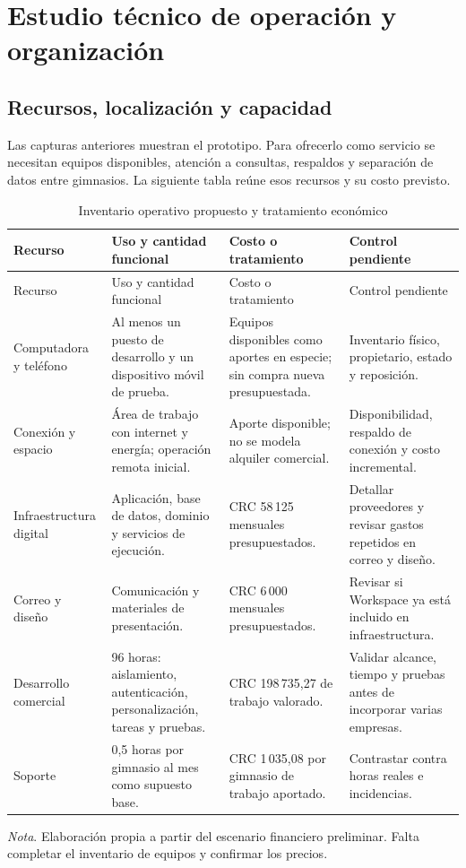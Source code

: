 \section{Estudio técnico de operación y organización}
\label{sec:organizacion}

\subsection{Recursos, localización y capacidad}

Las capturas anteriores muestran el prototipo. Para ofrecerlo como servicio se
necesitan equipos disponibles, atención a consultas, respaldos y separación de
datos entre gimnasios. La siguiente tabla reúne esos recursos y su costo
previsto.

\begin{longtable}{p{3cm}p{3.2cm}p{4cm}p{3.7cm}}
\caption{Inventario operativo propuesto y tratamiento económico}\\
\toprule Recurso & Uso y cantidad funcional & Costo o tratamiento & Control pendiente \\
\midrule\endfirsthead
\toprule Recurso & Uso y cantidad funcional & Costo o tratamiento & Control pendiente \\
\midrule\endhead
Computadora y teléfono & Al menos un puesto de desarrollo y un dispositivo móvil de prueba. & Equipos disponibles como aportes en especie; sin compra nueva presupuestada. & Inventario físico, propietario, estado y reposición. \\
Conexión y espacio & Área de trabajo con internet y energía; operación remota inicial. & Aporte disponible; no se modela alquiler comercial. & Disponibilidad, respaldo de conexión y costo incremental. \\
Infraestructura digital & Aplicación, base de datos, dominio y servicios de ejecución. & CRC 58\,125 mensuales presupuestados. & Detallar proveedores y revisar gastos repetidos en correo y diseño. \\
Correo y diseño & Comunicación y materiales de presentación. & CRC 6\,000 mensuales presupuestados. & Revisar si Workspace ya está incluido en infraestructura. \\
Desarrollo comercial & 96 horas: aislamiento, autenticación, personalización, tareas y pruebas. & CRC 198\,735,27 de trabajo valorado. & Validar alcance, tiempo y pruebas antes de incorporar varias empresas. \\
Soporte & 0,5 horas por gimnasio al mes como supuesto base. & CRC 1\,035,08 por gimnasio de trabajo aportado. & Contrastar contra horas reales e incidencias. \\
\bottomrule
\end{longtable}
{\small\textit{Nota}. Elaboración propia a partir del escenario financiero
preliminar. Falta completar el inventario de equipos y confirmar los precios.}

